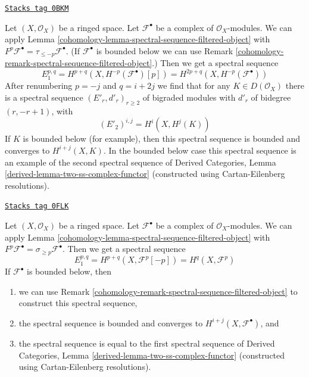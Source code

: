 \begin{example}
\label{cohomology-example-spectral-sequence}
\href{https://stacks.math.columbia.edu/tag/0BKM}{\texttt{Stacks tag 0BKM}}

Let $(X, \mathcal{O}_X)$ be a ringed space. Let $\mathcal{F}^\bullet$ be a
complex of $\mathcal{O}_X$-modules. We can apply
Lemma \ref{cohomology-lemma-spectral-sequence-filtered-object}
with $F^p\mathcal{F}^\bullet = \tau_{\leq -p}\mathcal{F}^\bullet$.
(If $\mathcal{F}^\bullet$ is bounded below we can use
Remark \ref{cohomology-remark-spectral-sequence-filtered-object}.)
Then we get a spectral sequence
$$
E_1^{p, q} = H^{p + q}(X, H^{-p}(\mathcal{F}^\bullet)[p]) =
H^{2p + q}(X, H^{-p}(\mathcal{F}^\bullet))
$$
After renumbering $p = -j$ and $q = i + 2j$ we find that for any
$K \in D(\mathcal{O}_X)$ there is a spectral sequence
$(E'_r, d'_r)_{r \geq 2}$ of bigraded modules with
$d'_r$ of bidegree $(r, -r + 1)$, with
$$
(E'_2)^{i, j} = H^i(X, H^j(K))
$$
If $K$ is bounded below (for example), then this spectral sequence
is bounded and converges to $H^{i + j}(X, K)$.
In the bounded below case this spectral sequence is an example
of the second spectral sequence of
Derived Categories, Lemma \ref{derived-lemma-two-ss-complex-functor}
(constructed using Cartan-Eilenberg resolutions).
\end{example}

\begin{example}
\label{cohomology-example-spectral-sequence-bis}
\href{https://stacks.math.columbia.edu/tag/0FLK}{\texttt{Stacks tag 0FLK}}

Let $(X, \mathcal{O}_X)$ be a ringed space. Let $\mathcal{F}^\bullet$ be a
complex of $\mathcal{O}_X$-modules. We can apply
Lemma \ref{cohomology-lemma-spectral-sequence-filtered-object}
with $F^p\mathcal{F}^\bullet = \sigma_{\geq p}\mathcal{F}^\bullet$.
Then we get a spectral sequence
$$
E_1^{p, q} = H^{p + q}(X, \mathcal{F}^p[-p]) = H^q(X, \mathcal{F}^p)
$$
If $\mathcal{F}^\bullet$ is bounded below, then
\begin{enumerate}
\item we can use
Remark \ref{cohomology-remark-spectral-sequence-filtered-object}
to construct this spectral sequence,
\item the spectral sequence is bounded and converges to
$H^{i + j}(X, \mathcal{F}^\bullet)$, and
\item the spectral sequence is equal to the first spectral sequence of
Derived Categories, Lemma \ref{derived-lemma-two-ss-complex-functor}
(constructed using Cartan-Eilenberg resolutions).
\end{enumerate}
\end{example}

